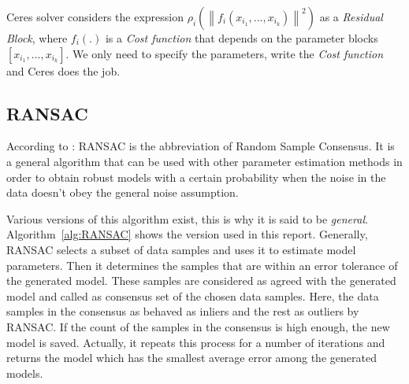 Ceres solver considers the expression $\rho_i \left(\left\lVert f_i(x_{i_1}, ..., x_{i_k})  \right\rVert^2 \right)$ as a \emph{Residual Block}, where $f_i(.)$ is a \emph{Cost function} that depends on the parameter blocks $[x_{i_1}, ..., x_{i_k}]$.
We only need to specify the parameters, write the \emph{Cost function} and Ceres does the job.


\subsection{RANSAC}
\label{subsc:ransac}
According to \cite{ransac}:
RANSAC is the abbreviation of Random Sample Consensus. It is a general algorithm that can be used with other parameter estimation methods in order to obtain robust models with a certain probability when the noise in the data doesn't obey the general noise assumption.

Various versions of this algorithm exist, this is why it is said to be \emph{general}. Algorithm~\ref{alg:RANSAC} shows the version used in this report. Generally, RANSAC selects a subset of data samples and uses it to estimate model parameters. Then it determines the samples that are within an error tolerance of the generated model. These samples are considered as agreed with the generated model and called as consensus set of the chosen data samples. Here, the data samples in the consensus as
behaved as inliers and the rest as outliers by RANSAC. If the count of the samples in the consensus is high enough, the new model is saved. Actually, it repeats this process for a number of iterations and returns the model which has the smallest average error among the generated models.


